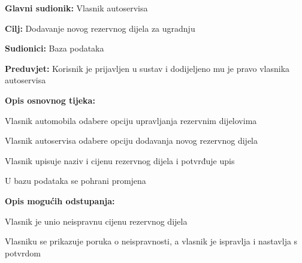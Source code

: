 					\noindent {}
					\begin{packed_item}

						\item \textbf{Glavni sudionik: } Vlasnik autoservisa
						\item  \textbf{Cilj:} Dodavanje novog rezervnog dijela za ugradnju
						\item  \textbf{Sudionici:} Baza podataka
						\item  \textbf{Preduvjet:} Korisnik je prijavljen u sustav i dodijeljeno mu je pravo vlasnika autoservisa
						\item  \textbf{Opis osnovnog tijeka:}

						\item[] \begin{packed_enum}

							\item Vlasnik automobila odabere opciju upravljanja rezervnim dijelovima
							\item Vlasnik autoservisa odabere opciju dodavanja novog rezervnog dijela
							\item Vlasnik upisuje naziv i cijenu rezervnog dijela i potvrđuje upis
							\item U bazu podataka se pohrani promjena

						\end{packed_enum}

						\item  \textbf{Opis mogućih odstupanja:}
						\item[] \begin{packed_item}
							\item[3.a] Vlasnik je unio neispravnu cijenu rezervnog dijela
							\item[] \begin{packed_enum}
								\item Vlasniku se prikazuje poruka o neispravnosti, a vlasnik je ispravlja i nastavlja s potvrdom
							\end{packed_enum}
						\end{packed_item}

					\end{packed_item}





